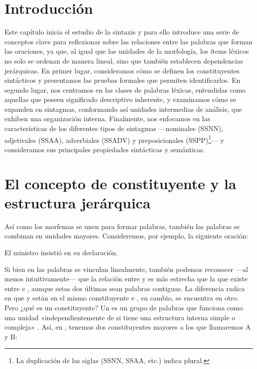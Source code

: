 
\section{Introducción}

Este capítulo inicia el estudio de la sintaxis y para ello introduce una serie
de conceptos clave para reflexionar sobre las relaciones entre las palabras que
forman las oraciones, ya que, al igual que las unidades de la morfología, los
ítems léxicos no solo se ordenan de manera lineal, sino que también establecen
dependencias jerárquicas. En primer lugar, consideramos cómo se definen los
constituyentes sintácticos y presentamos las pruebas formales que permiten
identificarlos. En segundo lugar, nos centramos en las clases de palabras
léxicas, entendidas como aquellas que poseen significado descriptivo inherente,
y examinamos cómo se expanden en sintagmas, conformando así unidades intermedias
de análisis, que exhiben una organización interna. Finalmente, nos enfocamos en
las características de los diferentes tipos de sintagmas ---nominales (SSNN),
adjetivales (SSAA), adverbiales (SSADV) y preposicionales
(SSPP)\footnote{La duplicación de las siglas (SSNN, SSAA, etc.) indica
plural.}--- y consideramos sus principales propiedades sintácticas y
semánticas.

\section{El concepto de constituyente y la estructura jerárquica}\label{sec:05-constituyente}

Así como los morfemas se unen para formar palabras, también las palabras se
combinan en unidades mayores. Consideremos, por ejemplo, la siguiente oración:

\begin{exe}
  \ex\label{ex:05-ministro} El ministro insistió en su declaración.
\end{exe}

Si bien en  las palabras se vinculan linealmente, también
podemos reconocer ---al menos intuitivamente--- que la relación entre
 y  es más estrecha que la que existe entre
 e , aunque estas dos últimas sean palabras
contiguas. La diferencia radica en que  y  están en el
mismo constituyente e , en cambio, se encuentra en otro. Pero
¿qué es un constituyente? Un  es un grupo de palabras que
funciona como una unidad «independientemente de si tiene una estructura interna
simple o compleja» \parencite[88]{camacho2018}. Así, en
, tenemos dos constituyentes mayores a los que llamaremos A y B:

